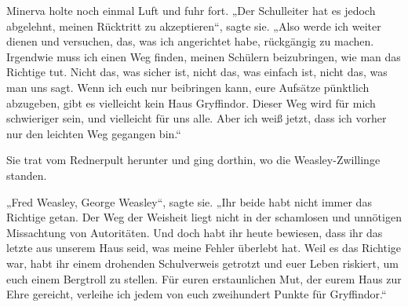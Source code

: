 \later

Minerva holte noch einmal Luft und fuhr fort.
„Der Schulleiter hat es jedoch abgelehnt, meinen Rücktritt zu akzeptieren“, sagte sie. „Also werde ich weiter dienen und versuchen, das, was ich angerichtet habe, rückgängig zu machen. Irgendwie muss ich einen Weg finden, meinen Schülern beizubringen, wie man das Richtige tut. Nicht das, was sicher ist, nicht das, was einfach ist, nicht das, was man uns sagt. Wenn ich euch nur beibringen kann, eure Aufsätze pünktlich abzugeben, gibt es vielleicht kein Haus Gryffindor. Dieser Weg wird für mich schwieriger sein, und vielleicht für uns alle. Aber ich weiß jetzt, dass ich vorher nur den leichten Weg gegangen bin.“

Sie trat vom Rednerpult herunter und ging dorthin, wo die Weasley-Zwillinge standen.

„Fred Weasley, George Weasley“, sagte sie. „Ihr beide habt nicht immer das Richtige getan. Der Weg der Weisheit liegt nicht in der schamlosen und unnötigen Missachtung von Autoritäten. Und doch habt ihr heute bewiesen, dass ihr das letzte aus unserem Haus seid, was meine Fehler überlebt hat. Weil es das Richtige war, habt ihr einem drohenden Schulverweis getrotzt und euer Leben riskiert, um euch einem Bergtroll zu stellen. Für euren erstaunlichen Mut, der eurem Haus zur Ehre gereicht, verleihe ich jedem von euch zweihundert Punkte für Gryffindor.“

